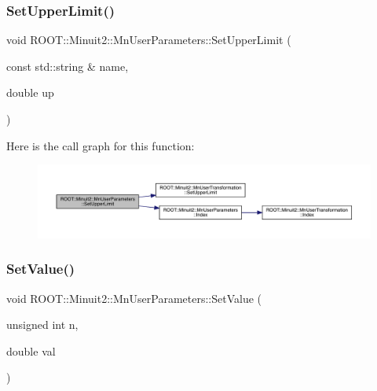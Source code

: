 \mbox{\label{classROOT_1_1Minuit2_1_1MnUserParameters_afc550532eeecdcb361f4c707032067e7}} 
\subsubsection{\texorpdfstring{SetUpperLimit()}{SetUpperLimit()}\hspace{0.1cm}{\footnotesize\ttfamily [6/6]}}
{\footnotesize\ttfamily void R\+O\+O\+T\+::\+Minuit2\+::\+Mn\+User\+Parameters\+::\+Set\+Upper\+Limit (\begin{DoxyParamCaption}\item[{const std\+::string \&}]{name,  }\item[{double}]{up }\end{DoxyParamCaption})}

Here is the call graph for this function\+:
\nopagebreak
\begin{figure}[H]
\begin{center}
\leavevmode
\includegraphics[width=350pt]{d6/d10/classROOT_1_1Minuit2_1_1MnUserParameters_afc550532eeecdcb361f4c707032067e7_cgraph}
\end{center}
\end{figure}
\mbox{\label{classROOT_1_1Minuit2_1_1MnUserParameters_a6a2523d00c1b000fbc1c95da7a4a926a}} 
\subsubsection{\texorpdfstring{SetValue()}{SetValue()}\hspace{0.1cm}{\footnotesize\ttfamily [1/6]}}
{\footnotesize\ttfamily void R\+O\+O\+T\+::\+Minuit2\+::\+Mn\+User\+Parameters\+::\+Set\+Value (\begin{DoxyParamCaption}\item[{unsigned int}]{n,  }\item[{double}]{val }\end{DoxyParamCaption})}


